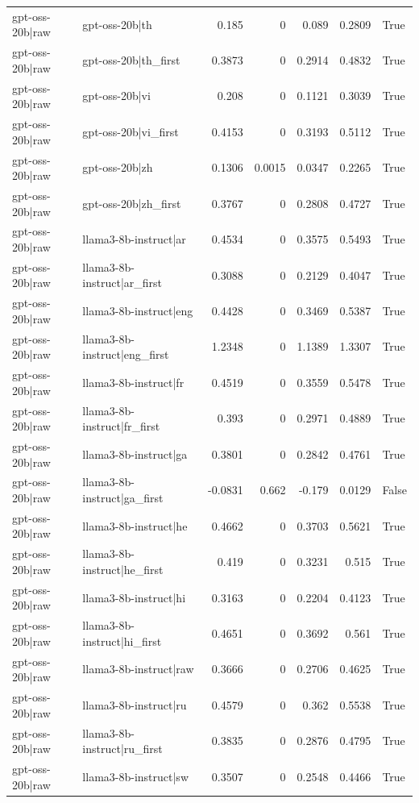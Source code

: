 \begin{table}
\begin{tabular}{l l r r r r l}
gpt-oss-20b|raw & gpt-oss-20b|th & 0.185 & 0 & 0.089 & 0.2809 & True \\
gpt-oss-20b|raw & gpt-oss-20b|th_first & 0.3873 & 0 & 0.2914 & 0.4832 & True \\
gpt-oss-20b|raw & gpt-oss-20b|vi & 0.208 & 0 & 0.1121 & 0.3039 & True \\
gpt-oss-20b|raw & gpt-oss-20b|vi_first & 0.4153 & 0 & 0.3193 & 0.5112 & True \\
gpt-oss-20b|raw & gpt-oss-20b|zh & 0.1306 & 0.0015 & 0.0347 & 0.2265 & True \\
gpt-oss-20b|raw & gpt-oss-20b|zh_first & 0.3767 & 0 & 0.2808 & 0.4727 & True \\
gpt-oss-20b|raw & llama3-8b-instruct|ar & 0.4534 & 0 & 0.3575 & 0.5493 & True \\
gpt-oss-20b|raw & llama3-8b-instruct|ar_first & 0.3088 & 0 & 0.2129 & 0.4047 & True \\
gpt-oss-20b|raw & llama3-8b-instruct|eng & 0.4428 & 0 & 0.3469 & 0.5387 & True \\
gpt-oss-20b|raw & llama3-8b-instruct|eng_first & 1.2348 & 0 & 1.1389 & 1.3307 & True \\
gpt-oss-20b|raw & llama3-8b-instruct|fr & 0.4519 & 0 & 0.3559 & 0.5478 & True \\
gpt-oss-20b|raw & llama3-8b-instruct|fr_first & 0.393 & 0 & 0.2971 & 0.4889 & True \\
gpt-oss-20b|raw & llama3-8b-instruct|ga & 0.3801 & 0 & 0.2842 & 0.4761 & True \\
gpt-oss-20b|raw & llama3-8b-instruct|ga_first & -0.0831 & 0.662 & -0.179 & 0.0129 & False \\
gpt-oss-20b|raw & llama3-8b-instruct|he & 0.4662 & 0 & 0.3703 & 0.5621 & True \\
gpt-oss-20b|raw & llama3-8b-instruct|he_first & 0.419 & 0 & 0.3231 & 0.515 & True \\
gpt-oss-20b|raw & llama3-8b-instruct|hi & 0.3163 & 0 & 0.2204 & 0.4123 & True \\
gpt-oss-20b|raw & llama3-8b-instruct|hi_first & 0.4651 & 0 & 0.3692 & 0.561 & True \\
gpt-oss-20b|raw & llama3-8b-instruct|raw & 0.3666 & 0 & 0.2706 & 0.4625 & True \\
gpt-oss-20b|raw & llama3-8b-instruct|ru & 0.4579 & 0 & 0.362 & 0.5538 & True \\
gpt-oss-20b|raw & llama3-8b-instruct|ru_first & 0.3835 & 0 & 0.2876 & 0.4795 & True \\
gpt-oss-20b|raw & llama3-8b-instruct|sw & 0.3507 & 0 & 0.2548 & 0.4466 & True \\

\end{tabular}
\end{table}
